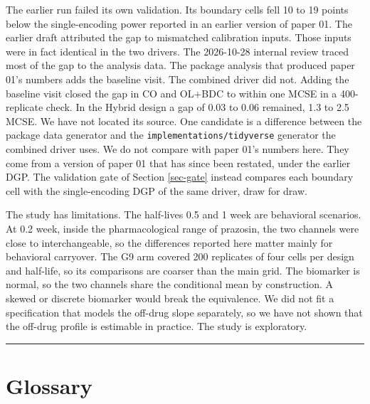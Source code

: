 \documentclass[
  11pt,
]{article}
\begin{document}
The earlier run failed its own validation. Its boundary cells fell
10 to 19 points below the single-encoding power reported in an
earlier version of paper 01. The earlier draft attributed the gap to
mismatched calibration inputs. Those inputs were in fact identical in
the two drivers. The 2026-10-28 internal review traced most of the gap
to the analysis data. The package analysis that produced paper 01's
numbers adds the baseline visit. The combined driver did not. Adding
the baseline visit closed the gap in CO and OL+BDC to within one MCSE
in a 400-replicate check. In the Hybrid design a gap of 0.03 to 0.06
remained, 1.3 to 2.5 MCSE. We have not located its source. One
candidate is a difference between the package data generator and the
\texttt{implementations/tidyverse} generator the combined driver uses. We do
not compare with paper 01's numbers here. They come from a version of
paper 01 that has since been restated, under the earlier DGP. The
validation gate of Section \ref{sec-gate} instead compares each
boundary cell with the single-encoding DGP of the same driver, draw
for draw.

The study has limitations. The half-lives 0.5 and 1 week are
behavioral scenarios. At 0.2 week, inside the pharmacological range of
prazosin, the two channels were close to interchangeable, so the
differences reported here matter mainly for behavioral carryover. The
G9 arm covered 200 replicates of four cells per design and half-life,
so its comparisons are coarser than the main grid. The biomarker is
normal, so the two channels share the
conditional mean by construction. A skewed or discrete biomarker
would break the equivalence. We did not fit a specification that
models the off-drug slope separately, so we have not shown that the
off-drug profile is estimable in practice. The study is exploratory.

\bigskip\noindent

\rule{\textwidth}{0.4pt}\bigskip

\section*{Glossary}\label{glossary}
\end{document}
